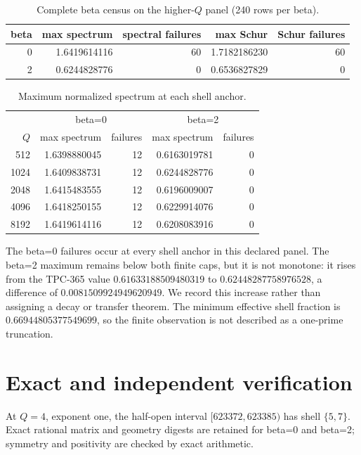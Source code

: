 \documentclass[10pt]{article}
\begin{document}
\begin{table}[t]
\centering
\caption{Complete beta census on the higher-$Q$ panel (240 rows per beta).}
\label{tab:beta}
\small
\begin{tabular}{r r r r r}
\toprule
beta & max spectrum & spectral failures & max Schur & Schur failures\\
\midrule
0 & 1.6419614116 & 60 & 1.7182186230 & 60\\
2 & 0.6244828776 & 0 & 0.6536827829 & 0\\
\bottomrule
\end{tabular}
\end{table}

\begin{table}[t]
\centering
\caption{Maximum normalized spectrum at each shell anchor.}
\label{tab:q}
\small
\begin{tabular}{r r r r r}
\toprule
 & \multicolumn{2}{c}{beta=0} & \multicolumn{2}{c}{beta=2}\\
$Q$ & max spectrum & failures & max spectrum & failures\\
\midrule
512  & 1.6398880045 & 12 & 0.6163019781 & 0\\
1024 & 1.6409838731 & 12 & 0.6244828776 & 0\\
2048 & 1.6415483555 & 12 & 0.6196009007 & 0\\
4096 & 1.6418250155 & 12 & 0.6229914076 & 0\\
8192 & 1.6419614116 & 12 & 0.6208083916 & 0\\
\bottomrule
\end{tabular}
\end{table}

The beta=0 failures occur at every shell anchor in this declared panel.  The
beta=2 maximum remains below both finite caps, but it is not monotone: it
rises from the TPC-365 value $0.61633188509480319$ to
$0.62448287758976528$, a difference of
$0.0081509924949620949$.  We record this increase rather than assigning a
decay or transfer theorem.  The minimum effective shell fraction is
$0.66944805377549699$, so the finite observation is not described as a
one-prime truncation.

\section{Exact and independent verification}

At $Q=4$, exponent one, the half-open interval
$[623372,623385)$ has shell $\{5,7\}$.  Exact rational matrix and geometry
digests are retained for beta=0 and beta=2; symmetry and positivity are
checked by exact arithmetic.
\end{document}
